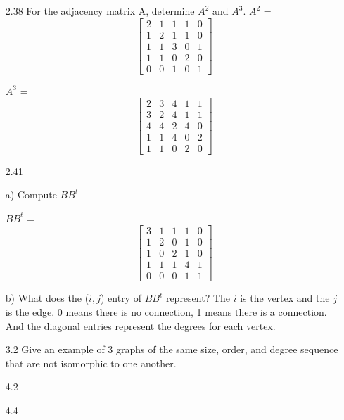 \documentclass[12pt]{article}
\begin{document}
\begin{enumerate}
\item[2.38] For the adjacency matrix A, determine $A^2$ and $A^3$.
\newline
$A^2$ =
\[
\begin{bmatrix}
2 & 1 & 1 & 1 & 0 \\
1 & 2 & 1 & 1 & 0  \\
1 & 1 & 3 & 0 & 1 \\
1 & 1 & 0 & 2 & 0  \\ 
0 & 0 & 1 & 0 & 1
\end{bmatrix}
\]

$A^3$ =
\[
\begin{bmatrix}
2 & 3 & 4 & 1 & 1 \\
3 & 2 & 4 & 1 & 1  \\
4 & 4 & 2 & 4 & 0 \\
1 & 1 & 4 & 0 & 2  \\ 
1 & 1 & 0 & 2 & 0
\end{bmatrix}
\]
 
\item[2.41] 
\item[] a) Compute $BB^t$
\item[] $BB^t$ =
\[
\begin{bmatrix}
3 & 1 & 1 & 1 & 0 \\
1 & 2 & 0 & 1 & 0  \\
1 & 0 & 2 & 1 & 0 \\
1 & 1 & 1 & 4 & 1  \\ 
0 & 0 & 0 & 1 & 1
\end{bmatrix}
\]
\item[] b) What does the ($i, j$) entry of $BB^t$ represent?
\newline
The $i$ is the vertex and the $j$ is the edge. 0 means there is no connection, 1 means there is a connection. 
And the diagonal entries represent the degrees for each vertex.

\item[3.2] Give an example of 3 graphs of the same size, order, and degree sequence that are not isomorphic to one another.

\item[4.2] 
\item[4.4] 

\end{enumerate}
\end{document}

